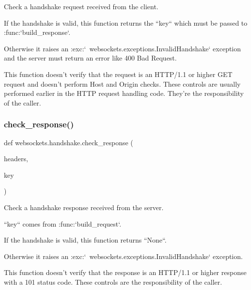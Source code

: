 \begin{DoxyVerb}Check a handshake request received from the client.

If the handshake is valid, this function returns the ``key`` which must be
passed to :func:`build_response`.

Otherwise it raises an :exc:`~websockets.exceptions.InvalidHandshake`
exception and the server must return an error like 400 Bad Request.

This function doesn't verify that the request is an HTTP/1.1 or higher GET
request and doesn't perform Host and Origin checks. These controls are
usually performed earlier in the HTTP request handling code. They're the
responsibility of the caller.\end{DoxyVerb}
 \mbox{\label{namespacewebsockets_1_1handshake_a358fc900cbcbb82de84710c8046987a6}} 
\subsubsection{\texorpdfstring{check\+\_\+response()}{check\_response()}}
{\footnotesize\ttfamily def websockets.\+handshake.\+check\+\_\+response (\begin{DoxyParamCaption}\item[{}]{headers,  }\item[{}]{key }\end{DoxyParamCaption})}

\begin{DoxyVerb}Check a handshake response received from the server.

``key`` comes from :func:`build_request`.

If the handshake is valid, this function returns ``None``.

Otherwise it raises an :exc:`~websockets.exceptions.InvalidHandshake`
exception.

This function doesn't verify that the response is an HTTP/1.1 or higher
response with a 101 status code. These controls are the responsibility of
the caller.\end{DoxyVerb}
 